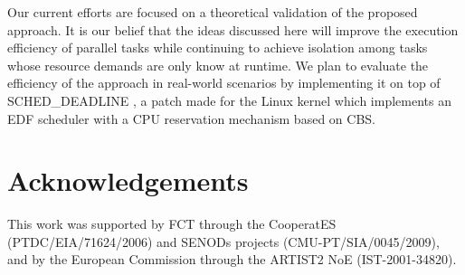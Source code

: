 \documentclass[10pt,twocolumn]{article}
\begin{document}
Our current efforts are focused on a theoretical validation of the proposed approach. It is our belief that the ideas discussed here will improve the execution efficiency of parallel tasks while continuing to achieve isolation among tasks whose resource demands are only know at runtime. We plan to evaluate the efficiency of the approach in real-world scenarios by implementing it on top of SCHED\_DEADLINE \cite{faggioli09}, a patch made for the Linux kernel which implements an EDF scheduler with a CPU reservation mechanism based on CBS.

\section*{Acknowledgements}
This work was supported by FCT through the CooperatES (PTDC/EIA/71624/2006) and SENODs projects (CMU-PT/SIA/0045/2009), and by the European Commission through the ARTIST2 NoE (IST-2001-34820).




\end{document}
